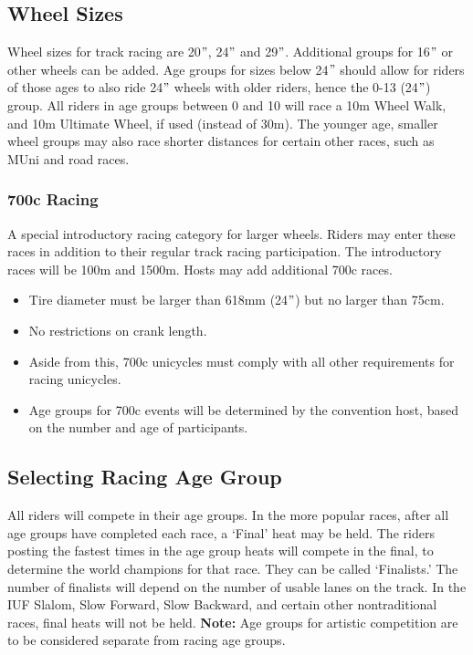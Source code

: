 \subsection{Wheel Sizes}
Wheel sizes for track racing are 20$"$, 24$"$ and 29$"$.
Additional groups for 16$"$ or other wheels can be added.
Age groups for sizes below 24$"$ should allow for riders of those ages to also ride 24$"$ wheels with older riders, hence the 0-13 (24$"$) group.
All riders in age groups between 0 and 10 will race a 10m Wheel Walk, and 10m Ultimate Wheel, if used (instead of 30m).
The younger age, smaller wheel groups may also race shorter distances for certain other races, such as MUni and road races.

\subsubsection{700c Racing}
A special introductory racing category for larger wheels.
Riders may enter these races in addition to their regular track racing participation.
The introductory races will be 100m and 1500m.
Hosts may add additional 700c races.
\begin{itemize}
\item Tire diameter must be larger than 618mm (24$"$) but no larger than 75cm.
\item No restrictions on crank length.
\item Aside from this, 700c unicycles must comply with all other requirements for racing unicycles.
\item Age groups for 700c events will be determined by the convention host, based on the number and age of participants.
\end{itemize}

\subsection{Selecting Racing Age Group}
All riders will compete in their age groups.
In the more popular races, after all age groups have completed each race, a ‘Final’ heat may be held.
The riders posting the fastest times in the age group heats will compete in the final, to determine the world champions for that race.
They can be called ‘Finalists.’ The number of finalists will depend on the number of usable lanes on the track.
In the IUF Slalom, Slow Forward, Slow Backward, and certain other nontraditional races, final heats will not be held.
\textbf{Note:} Age groups for artistic competition are to be considered separate from racing age groups.

